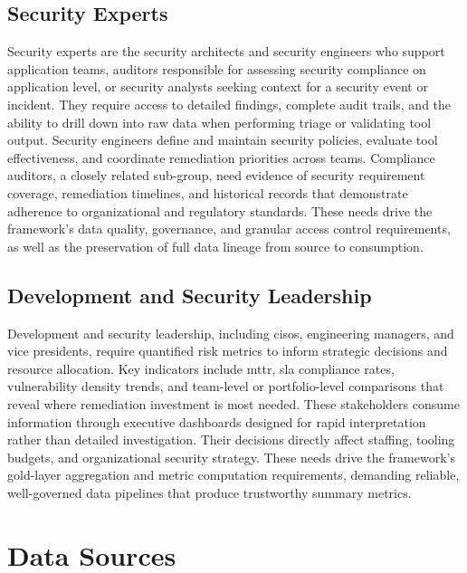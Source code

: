 \subsection{Security Experts}

Security experts are the security architects and security engineers who support application teams, auditors responsible for assessing security compliance on application level, or security analysts seeking context for a security event or incident. They require access to detailed findings, complete audit trails, and the ability to drill down into raw data when performing triage or validating tool output. Security engineers define and maintain security policies, evaluate tool effectiveness, and coordinate remediation priorities across teams. Compliance auditors, a closely related sub-group, need evidence of security requirement coverage, remediation timelines, and historical records that demonstrate adherence to organizational and regulatory standards. These needs drive the framework's data quality, governance, and granular access control requirements, as well as the preservation of full data lineage from source to consumption.

\subsection{Development and Security Leadership}

Development and security leadership, including \glspl{ciso}, engineering managers, and vice presidents, require quantified risk metrics to inform strategic decisions and resource allocation. Key indicators include \gls{mttr}, \gls{sla} compliance rates, vulnerability density trends, and team-level or portfolio-level comparisons that reveal where remediation investment is most needed. These stakeholders consume information through executive dashboards designed for rapid interpretation rather than detailed investigation. Their decisions directly affect staffing, tooling budgets, and organizational security strategy. These needs drive the framework's gold-layer aggregation and metric computation requirements, demanding reliable, well-governed data pipelines that produce trustworthy summary metrics.


\section{Data Sources}

